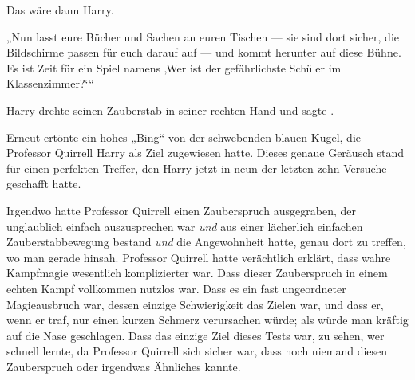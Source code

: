 Das wäre dann Harry.

„Nun lasst eure Bücher und Sachen an euren Tischen — sie sind dort sicher, die Bildschirme passen für euch darauf auf — und kommt herunter auf diese Bühne. Es ist Zeit für ein Spiel namens ‚Wer ist der gefährlichste Schüler im Klassenzimmer?‘“

\later

Harry drehte seinen Zauberstab in seiner rechten Hand und sagte .

Erneut ertönte ein hohes
„Bing“ von der schwebenden blauen Kugel, die Professor Quirrell Harry als Ziel zugewiesen hatte. Dieses genaue Geräusch stand für einen perfekten Treffer, den Harry jetzt in neun der letzten zehn Versuche geschafft hatte.

Irgendwo hatte Professor Quirrell einen Zauberspruch ausgegraben, der unglaublich einfach auszusprechen war \emph{und} aus einer lächerlich einfachen Zauberstabbewegung bestand \emph{und} die Angewohnheit hatte, genau dort zu treffen, wo man gerade hinsah. Professor Quirrell hatte verächtlich erklärt, dass wahre Kampfmagie wesentlich komplizierter war. Dass dieser Zauberspruch in einem echten Kampf vollkommen nutzlos war. Dass es ein fast ungeordneter Magieausbruch war, dessen einzige Schwierigkeit das Zielen war, und dass er, wenn er traf, nur einen kurzen Schmerz verursachen würde; als würde man kräftig auf die Nase geschlagen. Dass das einzige Ziel dieses Tests war, zu sehen, wer schnell lernte, da Professor Quirrell sich sicher war, dass noch niemand diesen Zauberspruch oder irgendwas Ähnliches kannte.

